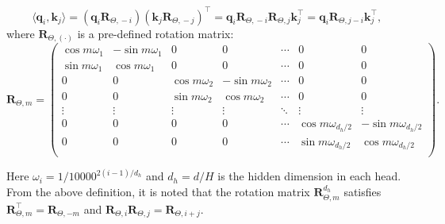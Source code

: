 \begin{equation}
    \langle\boldsymbol{q}_i\textrm{,}\, \boldsymbol{k}_j\rangle=\left(\boldsymbol{q}_i\boldsymbol{R}_{\Theta\textrm{,}\,-i}\right)\left( \boldsymbol{k}_j\boldsymbol{R}_{\Theta\textrm{,}\,-j}\right)^\top=\boldsymbol{q}_i\boldsymbol{R}_{\Theta\textrm{,}\,-i}\boldsymbol{R}_{\Theta\textrm{,}\,j}\boldsymbol{k}_j^\top=\boldsymbol{q}_i\boldsymbol{R}_{\Theta\textrm{,}\,j-i} \boldsymbol{k}_j^\top\textrm{,}
\end{equation}
where $\boldsymbol{R}_{\Theta\textrm{,}\,(\cdot)}$ is a pre-defined rotation matrix:
\begin{equation}\boldsymbol{R}_{\Theta,m}=
\left(
    \begin{array}{ccccccc}
       \cos m\omega_1  & -\sin m\omega_1 & 0 & 0 & \cdots & 0 & 0 \\
        \sin m\omega_1  & \cos m\omega_1 & 0 & 0 & \cdots & 0 & 0 \\
        0 & 0 & \cos m\omega_2  & -\sin m\omega_2  &\cdots & 0 & 0  \\
        0 & 0 & \sin m\omega_2  & \cos m\omega_2  &\cdots & 0 & 0  \\
        \vdots & \vdots & \vdots & \vdots & \ddots & \vdots & \vdots \\
        0 & 0 &  0 & 0 & \cdots & \cos m\omega_{d_h/2}  & -\sin m\omega_{d_h/2}\\
         0 & 0 &  0 & 0 & \cdots &  \sin m\omega_{d_h/2}  & \cos m\omega_{d_h/2}\\
    \end{array}
    \right)\textrm{.}
\end{equation}

Here $\omega_i=1/\textrm{10000}^{2(i-1)/d_h}$ and $d_h=d/H$ is the hidden dimension in each head. From the above definition, it is noted that the rotation matrix $\boldsymbol{R}_{\Theta,m}^{d_h}$ satisfies $\boldsymbol{R}_{\Theta,m}^\top=\boldsymbol{R}_{\Theta,-m}$ and $\boldsymbol{R}_{\Theta,i}\boldsymbol{R}_{\Theta,j}=\boldsymbol{R}_{\Theta,i+j}$.




